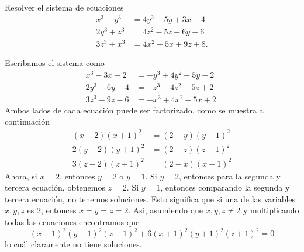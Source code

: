 \begin{example}
    Resolver el sistema de ecuaciones
    \begin{align*}
        x^3 + y^3  &= 4y^2 - 5y + 3x + 4\\
        2y^3 + z^3 &= 4z^2 - 5z + 6y + 6\\
        3z^3 + x^3 &= 4x^2 - 5x + 9z + 8.
    \end{align*}
\end{example}
\begin{solution}
    Escribamos el sistema como
    \begin{align*}
         x^3 - 3x - 2 &= -y^3 + 4y^2 - 5y + 2\\
        2y^3 - 6y - 4 &= -z^3 + 4z^2 - 5z + 2\\
        3z^3 - 9z - 6 &= -x^3 + 4x^2 - 5x + 2.
    \end{align*}
    Ambos lados de cada ecuación puede ser factorizado, como se muestra a continuación
    \begin{align*}
         (x - 2)(x + 1)^2 &= (2 - y)(y - 1)^2\\
        2(y - 2)(y + 1)^2 &= (2 - z)(z - 1)^2\\
        3(z - 2)(z + 1)^2 &= (2 - x)(x - 1)^2
    \end{align*}
    Ahora, si $x = 2$, entonces $y = 2$ o $y = 1$.
    Si $y = 2$, entonces para la segunda y tercera ecuación, obtenemos $z = 2$.
    Si $y = 1$, entonces comparando la segunda y tercera ecuación, no tenemos soluciones.
    Esto significa que si una de las variables $x, y, z$ es 2, entonces $x = y = z = 2$.
    Asi, asumiendo que $x,y, z \neq 2$ y multiplicando todas las ecuaciones encontramos que
    \[
       (x - 1)^2 (y - 1)^2 (z - 1)^2 + 6(x + 1)^2 (y + 1)^2 (z + 1)^2 = 0
    \]
    lo cuál claramente no tiene soluciones.
\end{solution}


